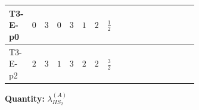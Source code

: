 \documentclass[8pt]{article}
\begin{document}
\begin{landscape}
\begin{longtable}{@{}llcccccc >{\raggedright\arraybackslash}p{0.21\linewidth} >{\raggedright\arraybackslash}p{0.21\linewidth} >{\raggedright\arraybackslash}p{0.21\linewidth}@{}}
\midrule
T3-E-p0 & $0$ & $3$ & $0$ & $3$ & $1$ & $2$ & $\frac{1}{2}$ & \scriptsize\adjustbox{max width=\linewidth}{$\begin{gathered} {\lambda_{HS_2}^{(A)}} (2 T_{\nu}^{(2)}+6 \operatorname{Tr}\!\left({Y_d}\,\left({Y_d}\right)^{\dagger}\right)+2 \operatorname{Tr}\!\left({Y_e}\,\left({Y_e}\right)^{\dagger}\right)+6 \operatorname{Tr}\!\left({Y_u}\,\left({Y_u}\right)^{\dagger}\right)+16 {\lambda_{S_2}^{(A)}})\end{gathered}$} & \scriptsize\adjustbox{max width=\linewidth}{$\begin{gathered} +\frac{4}{3} \operatorname{Tr}\!\left({y_2}\,\left({y_2}\right)^{\dagger}\,{Y_e}\,\left({Y_e}\right)^{\dagger}\right)\end{gathered}$} & \scriptsize\adjustbox{max width=\linewidth}{$\begin{gathered} -\frac{8}{9} {\lambda_5} \left({\lambda_5}\right)^{*}\end{gathered}$} \\
\midrule
T3-E-p2 & $2$ & $3$ & $1$ & $3$ & $2$ & $2$ & $\frac{3}{2}$ & \scriptsize\adjustbox{max width=\linewidth}{$\begin{gathered} {\lambda_{HS_2}^{(A)}} (2 T_{\nu}^{(2)}+6 \operatorname{Tr}\!\left({Y_d}\,\left({Y_d}\right)^{\dagger}\right)+2 \operatorname{Tr}\!\left({Y_e}\,\left({Y_e}\right)^{\dagger}\right)+6 \operatorname{Tr}\!\left({Y_u}\,\left({Y_u}\right)^{\dagger}\right)+16 {\lambda_{S_2}^{(A)}})\end{gathered}$} & \scriptsize\adjustbox{max width=\linewidth}{$\begin{gathered} +\frac{4}{3} \operatorname{Tr}\!\left({y_2}\,\left({y_2}\right)^{\dagger}\,{Y_e}\,\left({Y_e}\right)^{\dagger}\right)\end{gathered}$} & \scriptsize\adjustbox{max width=\linewidth}{$\begin{gathered} -\frac{8}{9} {\lambda_5} \left({\lambda_5}\right)^{*}\end{gathered}$} \\
\midrule
\bottomrule
\end{longtable}
\clearpage
\noindent\textbf{Quantity: }$\lambda_{HS_2}^{(A)}$\par\smallskip

\end{landscape}
\end{document}
